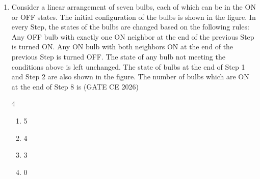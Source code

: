 \begin{enumerate}[label=\thesubsection.\arabic*, ref=\thesubsection.\theenumi, itemsep=0pt, leftmargin=*]
\begin{lstlisting}[frame=single, basicstyle=\rmfamily, escapeinside={(*@}{@*)}]
(*@\makebox[\dimexpr\linewidth-2\fboxsep-2\fboxrule\relax][c]{codes/ce1q7/q07.py}@*)
\end{lstlisting}
\begin{lstlisting}[frame=single, basicstyle=\rmfamily, escapeinside={(*@}{@*)}]
(*@\makebox[\dimexpr\linewidth-2\fboxsep-2\fboxrule\relax][c]{codes/ce1q7/q07plot.py}@*)
\end{lstlisting}








\item Consider a linear arrangement of seven bulbs, each of which can be in the ON or OFF states. The initial configuration of the bulbs is shown in the figure. In every Step, the states of the bulbs are changed based on the following rules: Any OFF bulb with exactly one ON neighbor at the end of the previous Step is turned ON. Any ON bulb with both neighbors ON at the end of the previous Step is turned OFF. The state of any bulb not meeting the conditions above is left unchanged. The state of bulbs at the end of Step 1 and Step 2 are also shown in the figure. The number of bulbs which are ON at the end of Step 8 is \hfill (GATE CE 2026)

\begin{multicols}{4}
\begin{enumerate}[label=\alph*), itemsep=0pt]
    \item 5
    \item 4
    \item 3
    \item 0
\end{enumerate}
\end{multicols}

\newcommand{\bulb}[3]{
  \draw[fill=#3, thick] (#1,#2) circle (0.16);
  \draw[fill=white, thin] (#1-0.05, #2-0.24) rectangle (#1+0.05, #2-0.15);
}

\begin{center}
\end{center}
\end{enumerate}
